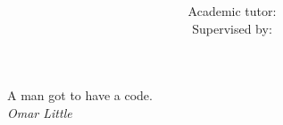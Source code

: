 \documentclass[paper=a4, fontsize=12pt, twoside=semi, abstracton, listof=totoc, toc=left]{scrartcl}
\title{
	\normalfont
	\small \scshape{\myuni} \\ [25pt]
	\horrule{0.5pt} \\ [0.4cm]
	\Huge \mytitle \\[0.2cm]
	\horrule{2pt} \\ [10.5cm]
}
\author{
	\myauthor \\
	\small Academic tutor: \mytutor \\
	\small Supervised by: \mysupervisor
}
\date{\mydate}
\newenvironment{mydedication}
	{\clearpage           %
	\thispagestyle{empty}%
	\vspace*{\stretch{1}}%
	\itshape             %
	\raggedleft          %
	}
	{\par %
	\vspace{\stretch{3}} %
	\clearpage           %
	}
\begin{document}

\clearpage
\maketitle
\thispagestyle{empty}
\addtocounter{page}{-1}

\begin{mydedication}
	A man got to have a code. \\[0.1cm]
	\emph{Omar Little}
\end{mydedication}






\tableofcontents










\begin{appendices}



\end{appendices}{}



\printbibliography[heading=bibintoc]
\setcounter{secnumdepth}{0}
\end{document}
